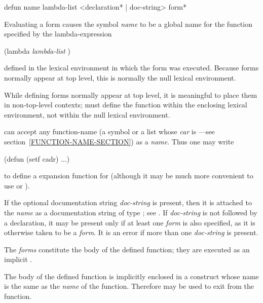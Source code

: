 \begin{defmac}
defun name lambda-list <{declaration}* | doc-string> {form}*

Evaluating a  form causes the symbol \emph{name} to be a global name
for the function specified by the lambda-expression
\begin{lisp}
(lambda \emph{lambda-list}  )
\end{lisp}
defined in the lexical environment in which the  form was
executed.  Because  forms normally appear at top level, this is
normally the null lexical environment.

While defining forms normally appear at top level,
it is meaningful to place them in non-top-level contexts;
 must define the function
within the enclosing lexical environment, not within the null lexical
environment.

can accept any function-name (a symbol or a list
whose \emph{car} is ---see section~\ref{FUNCTION-NAME-SECTION})
as a \emph{name}.
Thus one may write
\begin{lisp}
(defun (setf cadr) ...)
\end{lisp}
to define a 
expansion function for  
(although it may be much more convenient to
use  or ).

If the optional documentation string \emph{doc-string} is present,
then it is attached to the \emph{name}
as a documentation string of type ; see .
If \emph{doc-string} is not
followed by a declaration, it may be
present only if at least one \emph{form} is also specified, as it is
otherwise taken to be a \emph{form}.
It is an error if more than one \emph{doc-string} is present.

The \emph{forms} constitute the body of the defined function; they are
executed as an implicit .

The body of the defined function is implicitly enclosed
in a  construct whose name is the same as the \emph{name}
of the function.  Therefore 
may be used to exit from the function.


\end{defmac}
